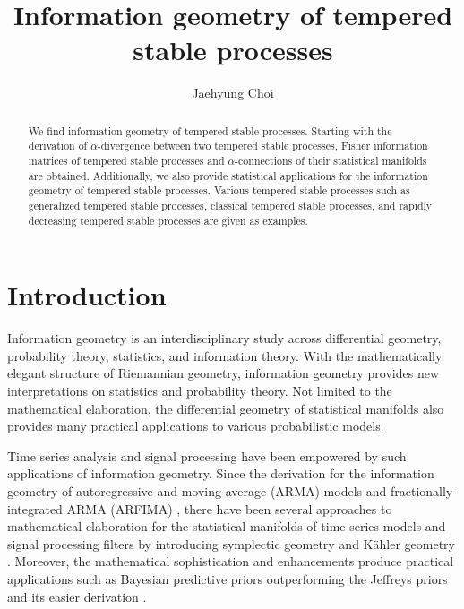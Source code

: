 \documentclass[preprint,11pt]{amsart}
\begin{document}
\title{Information geometry of tempered stable processes}
\author{Jaehyung Choi}
\address{Goldman Sachs \& Co., 200 West Street, New York, NY 10282, USA}

\begin{abstract}
	We find information geometry of tempered stable processes. Starting with the derivation of $\alpha$-divergence between two tempered stable processes, Fisher information matrices of tempered stable processes and $\alpha$-connections of their statistical manifolds are obtained. Additionally, we also provide statistical applications for the information geometry of tempered stable processes. Various tempered stable processes such as generalized tempered stable processes, classical tempered stable processes, and rapidly decreasing tempered stable processes are given as examples. 
\end{abstract}

\maketitle
\section{Introduction}
\label{sec_intro}
	Information geometry is an interdisciplinary study across differential geometry, probability theory, statistics, and information theory. With the mathematically elegant structure of Riemannian geometry, information geometry provides new interpretations on statistics and probability theory. Not limited to the mathematical elaboration, the differential geometry of statistical manifolds also provides many practical applications to various probabilistic models.
	
	Time series analysis and signal processing have been empowered by such applications of information geometry. Since the derivation for the information geometry of autoregressive and moving average (ARMA) models \cite{ravishanker1990differential} and fractionally-integrated ARMA (ARFIMA) \cite{ravishanker2001differential}, there have been several approaches to mathematical elaboration for the statistical manifolds of time series models and signal processing filters by introducing symplectic geometry and K\"ahler geometry \cite{barndorff1997statistics, barbaresco2006information, barbaresco2012information, zhang2013symplectic, barbaresco2014koszul, choi2015kahlerian,choi2021kahlerian}. Moreover, the mathematical sophistication and enhancements produce practical applications such as Bayesian predictive priors outperforming the Jeffreys priors and its easier derivation \cite{komaki2006shrinkage, tanaka2008superharmonic, tanaka2018superharmonic, choi2015kahlerian, choi2015geometric, oda2021shrinkage}.
	
\end{document}
